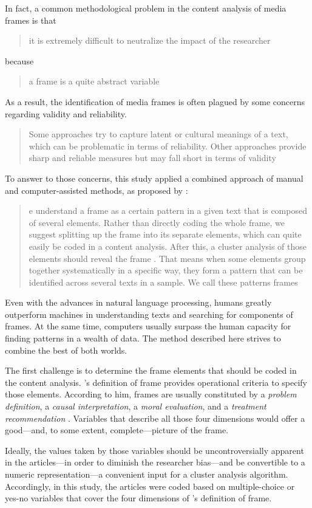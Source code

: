 In fact, a common methodological problem in the content analysis of media frames is that \blockcquote[503]{vanGorp01122005}{it is extremely difficult to neutralize the impact of the researcher} because \blockcquote{matthes2008content}[.]{a frame is a quite abstract variable} As a result, the identification of media frames is often plagued by some concerns regarding validity and reliability. \blockcquote{matthes2008content}[.]{Some
approaches try to capture latent or cultural meanings of a text, which can be problematic in terms of reliability. Other approaches provide sharp and reliable measures but may fall short in terms of validity}

To answer to those concerns, this study applied a combined approach of manual and computer-assisted methods, as proposed by \citeauthor{matthes2008content}: \blockcquote{matthes2008content}[.]{e understand a frame as a certain pattern in a given text that is composed of several elements. \textelp{} Rather than directly coding the whole frame, we suggest splitting up the frame into its separate elements, which can quite easily be coded in a content analysis. After this, a cluster analysis of those elements should reveal the frame \autocite{Kohring01042002}. That means when some elements group together systematically in a specific way, they form a pattern that can be identified across several texts in a sample. We call these patterns frames}

Even with the advances in natural language processing, humans greatly outperform machines in understanding texts and searching for components of frames. At the same time, computers usually surpass the human capacity for finding patterns in a wealth of data. The method described here strives to combine the best of both worlds.

The first challenge is to determine the frame elements that should be coded in the content analysis. \citeauthor{entman1993framing}'s definition of frame provides operational criteria to specify those elements. According to him, frames are usually constituted by a \emph{problem definition}, a \emph{causal interpretation}, a \emph{moral evaluation}, and a \emph{treatment recommendation} \autocite{entman1993framing}. Variables that describe all those four dimensions would offer a good---and, to some extent, complete---picture of the frame.

Ideally, the values taken by those variables should be uncontroversially apparent in the articles---in order to diminish the researcher bias---and be convertible to a numeric representation---a convenient input for a cluster analysis algorithm. Accordingly, in this study, the articles were coded based on multiple-choice or yes-no variables that cover the four dimensions of \citeauthor{entman1993framing}'s definition of frame.

